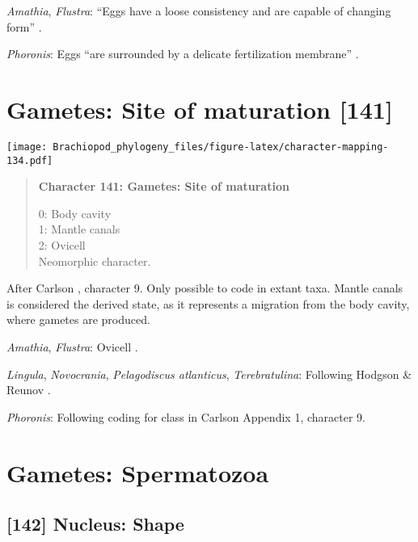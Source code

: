 \documentclass[openany]{book}
\theoremstyle{definition}
\theoremstyle{definition}
\theoremstyle{definition}
\theoremstyle{remark}
\begin{document}
\hypertarget{Amathia-coding-140}{}
\emph{Amathia}, \emph{Flustra}: ``Eggs have a loose consistency and are
capable of changing form'' \citep{Franzen1977}.

\hypertarget{Phoronis-coding-140}{}
\emph{Phoronis}: Eggs ``are surrounded by a delicate fertilization
membrane'' \citep{Pennerstorfer2012}.

\section{Gametes: Site of maturation
{[}141{]}}\label{gametes-site-of-maturation-141}

\texttt{[image: Brachiopod\_phylogeny\_files/figure-latex/character-mapping-134.pdf]}

\begin{quote}
\textbf{Character 141: Gametes: Site of maturation}

0: Body cavity\\
1: Mantle canals\\
2: Ovicell\\
Neomorphic character.
\end{quote}

After Carlson \citeyearpar{Carlson1995Phylogeneticrelationships},
character 9. Only possible to code in extant taxa. Mantle canals is
considered the derived state, as it represents a migration from the body
cavity, where gametes are produced.

\hypertarget{Amathia-coding-141}{}
\emph{Amathia}, \emph{Flustra}: Ovicell \citep{Franzen1977}.

\hypertarget{Lingula-coding-141}{}
\emph{Lingula}, \emph{Novocrania}, \emph{Pelagodiscus atlanticus},
\emph{Terebratulina}: Following Hodgson \& Reunov
\citeyearpar{Hodgson1994Ultrastructureof}.

\hypertarget{Phoronis-coding-141}{}
\emph{Phoronis}: Following coding for class in Carlson
\citeyearpar{Carlson1995Phylogeneticrelationships} Appendix 1, character
9.

\section{Gametes: Spermatozoa}\label{gametes-spermatozoa}

\subsection*{{[}142{]} Nucleus: Shape}\label{nucleus-shape}
\end{document}
